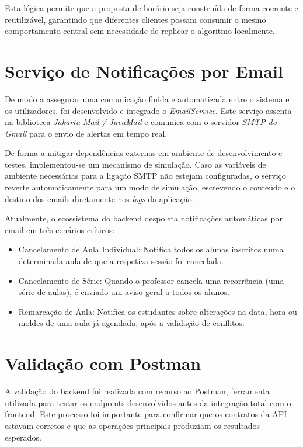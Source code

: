 Esta lógica permite que a proposta de horário seja construída de forma coerente e reutilizável, garantindo que diferentes clientes possam consumir
o mesmo comportamento central sem necessidade de replicar o algoritmo localmente.

\section{Serviço de Notificações por Email}

De modo a assegurar uma comunicação fluida e automatizada entre o sistema e os utilizadores, foi desenvolvido e integrado o \textit{EmailService}. Este serviço assenta na biblioteca \textit{Jakarta Mail / JavaMail} e comunica com o servidor \textit{SMTP do Gmail} para o envio de alertas em tempo real.

De forma a mitigar dependências externas em ambiente de desenvolvimento e testes, implementou-se um mecanismo de simulação. Caso as variáveis de ambiente necessárias para a ligação SMTP não estejam configuradas, o serviço reverte automaticamente para um modo de simulação, escrevendo o conteúdo e o destino dos emails diretamente nos \textit{logs} da aplicação.

Atualmente, o ecossistema do backend despoleta notificações automáticas por email em três cenários críticos:
\begin{itemize}
    \item  Cancelamento de Aula Individual: Notifica todos os alunos inscritos numa determinada aula de que a respetiva sessão foi cancelada.
    \item Cancelamento de Série: Quando o professor cancela uma recorrência (uma série de aulas), é enviado um aviso geral a todos os alunos.
    \item Remarcação de Aula: Notifica os estudantes sobre alterações na data, hora ou moldes de uma aula já agendada, após a validação de conflitos.
\end{itemize}

\section{Validação com Postman}

A validação do backend foi realizada com recurso ao Postman, ferramenta utilizada para testar os endpoints desenvolvidos antes da integração total com o frontend.
Este processo foi importante para confirmar que os contratos da API estavam corretos e que as operações principais produziam os resultados esperados.

